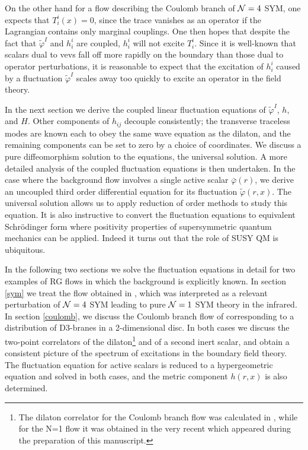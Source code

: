 \documentclass[a4paper,12pt]{article}
\def\varphit{\tilde{\varphi}}
\begin{document}
On the other hand for a flow describing the Coulomb branch of ${\cal
N}=4$ SYM, one expects that $T_i^i(x)=0$, since the trace vanishes as
an operator if the Lagrangian contains only marginal couplings.  One
then hopes that despite the fact that $\varphit^I$ and $h^i_i$ are
coupled, $h^i_i$ will not excite $T^i_i$.  Since it is well-known that
scalars dual to vevs fall off more rapidly on the boundary than those
dual to operator perturbations, it is reasonable to expect that the excitation
of $h^i_i$ caused by a fluctuation $\varphit^I$ scales away too
quickly to excite an operator in the field theory.  

In the next section we derive the coupled linear fluctuation equations
of $\varphit^I$, $h$, and $H$. Other components of $h_{ij}$ decouple
consistently; the transverse traceless modes are known each to obey
the same wave equation as the dilaton, and the remaining components
can be set to zero by a choice of coordinates.  We discuss a pure
diffeomorphism solution to the equations, the universal solution.  A
more detailed analysis of the coupled fluctuation equations is then
undertaken.  In the case where the background flow involves a single
active scalar $\bar{\varphi}(r)$, we derive an uncoupled third order
differential equation for its fluctuation $\tilde{\varphi}(r,x)$.  The
universal solution allows us to apply reduction of order methods to
study this equation. It is also instructive to convert the fluctuation
equations to equivalent Schr\"odinger form where positivity properties
of supersymmetric quantum mechanics can be applied.  Indeed it turns
out that the role of SUSY QM is ubiquitous.

In the following two sections we solve the fluctuation equations in
detail for two examples of RG flows in which the background is
explicitly known. In section \ref{sym} we treat the flow obtained in
\cite{gppz}, which was interpreted as a relevant perturbation of
${\cal N}=4$ SYM leading to pure ${\cal N}=1$ SYM theory in the
infrared.  In section \ref{coulomb}, we discuss the Coulomb branch
flow of \cite{fgpw2} corresponding to a distribution of D3-branes in a
2-dimensional disc. In both cases we discuss the two-point correlators
of the dilaton\footnote{The dilaton correlator for the Coulomb branch
flow was calculated in \cite{fgpw2}, while for the N=1 flow it was
obtained in the very recent \cite{agpz} which appeared during the
preparation of this manuscript.  } and of a second inert scalar, and
obtain a consistent picture of the spectrum of excitations in the
boundary field theory.  The fluctuation equation for active scalars is
reduced to a hypergeometric equation and solved in both cases, and the
metric component $h(r,x)$ is also determined.
\end{document}
